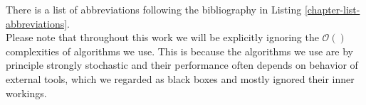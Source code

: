 There is a list of abbreviations following the bibliography in Listing \ref{chapter-list-abbreviations}.\\

Please note that throughout this work we will be explicitly ignoring the $\mathcal{O}()$ complexities of algorithms we use. This is because the algorithms we use are by principle strongly stochastic and their performance often depends on behavior of external tools, which we regarded as black boxes and mostly ignored their inner workings.